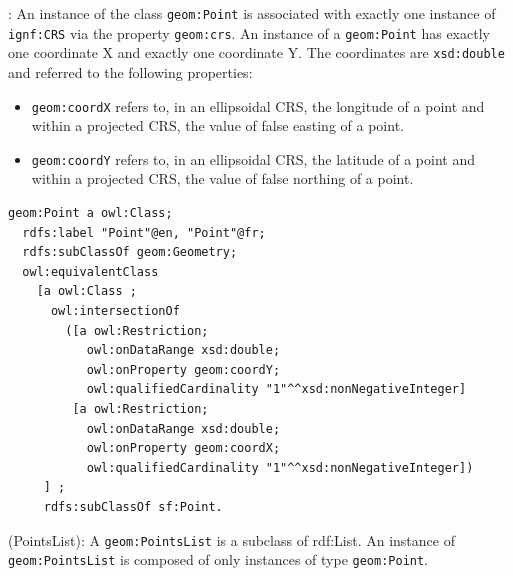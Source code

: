 \begin{deflda}:
An instance of the class \texttt{geom:Point} is associated with exactly one instance of \texttt{ignf:CRS} via the property \texttt{geom:crs}. An instance of a \texttt{geom:Point} has exactly one coordinate X and exactly one coordinate Y. The coordinates are \texttt{xsd:double} and referred to the following properties:
\begin{itemize}
 \item \texttt{geom:coordX} refers to, in an ellipsoidal CRS, the longitude of a point and within a projected CRS, the value of false easting of a point.
 \item \texttt{geom:coordY} refers to, in an ellipsoidal CRS, the latitude of a point and within a projected CRS, the value of false northing of a point.
\end{itemize}
\end{deflda}


\begin{lstlisting}
geom:Point a owl:Class;
  rdfs:label "Point"@en, "Point"@fr;
  rdfs:subClassOf geom:Geometry;
  owl:equivalentClass
    [a owl:Class ;
	  owl:intersectionOf
		([a owl:Restriction;
		   owl:onDataRange xsd:double;
		   owl:onProperty geom:coordY;
	       owl:qualifiedCardinality "1"^^xsd:nonNegativeInteger]
         [a owl:Restriction;
		   owl:onDataRange xsd:double;
		   owl:onProperty geom:coordX;
		   owl:qualifiedCardinality "1"^^xsd:nonNegativeInteger])
     ] ;
     rdfs:subClassOf sf:Point.
\end{lstlisting}

\begin{deflda}
(PointsList): A \texttt{geom:PointsList} is a subclass of rdf:List. An instance of \texttt{geom:PointsList} is composed of only instances of type \texttt{geom:Point}.

\end{deflda}

